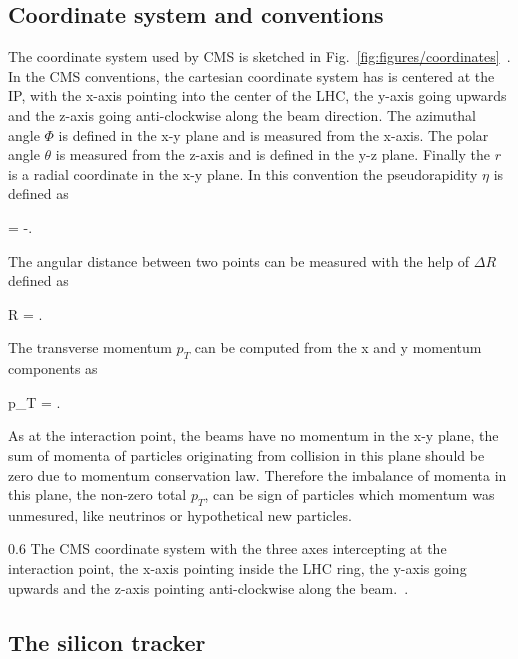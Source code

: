 \subsection{Coordinate system and conventions}


The coordinate system used by CMS is sketched in Fig.~\ref{fig:figures/coordinates}~\cite{Pantaleo:2293435}. In the CMS conventions, the cartesian coordinate system has is centered at the IP, with the x-axis pointing into the center of the LHC, the y-axis going upwards and the z-axis going anti-clockwise along the beam direction. The azimuthal angle $\Phi$ is defined in the x-y plane and is measured from the x-axis. The polar angle $\theta$ is measured from the z-axis and is defined in the y-z plane. Finally the $r$ is a radial coordinate in the x-y plane. In this convention the pseudorapidity $\eta$ is defined as

{
    \eta =  -\ln {}.
}

The angular distance between two points can be measured with the help of $\Delta R$ defined as

{
    \Delta R = .
}


The transverse momentum $p_{T}$ can be computed from the x and y momentum components as

{
    p_{T} =  .
}

As at the interaction point, the beams have no momentum in the x-y plane, the sum of momenta of particles originating from collision in this plane should be zero due to momentum conservation law. Therefore the imbalance of momenta in this plane, the non-zero total $p_{T}$, can be sign of particles which momentum was unmesured, like neutrinos or hypothetical new particles. 

                 {0.6}       %
                 { The CMS coordinate system with the three axes intercepting at the interaction point, the x-axis pointing inside the LHC ring, the y-axis going upwards and the z-axis pointing anti-clockwise along the beam.~\cite{Pantaleo:2293435}. }

\subsection{The silicon tracker~\label{sec:tracker}}

